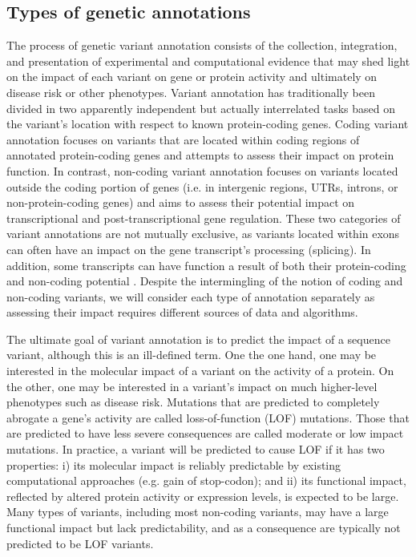 \subsection{Types of genetic annotations}

The process of genetic variant annotation consists of the collection, integration, and presentation of experimental and computational evidence that may shed light on the impact of each variant on gene or protein activity and ultimately on disease risk or other phenotypes. 
Variant annotation has traditionally been divided in two apparently independent but actually interrelated tasks based on the variant's location with respect to known protein-coding genes. 
Coding variant annotation focuses on variants that are located within coding regions of annotated protein-coding genes and attempts to assess their impact on protein function. 
In contrast, non-coding variant annotation focuses on variants located outside the coding portion of genes (i.e. in intergenic regions, UTRs, introns, or non-protein-coding genes) and aims to assess their potential impact on transcriptional and post-transcriptional gene regulation. 
These two categories of variant annotations are not mutually exclusive, as variants located within exons can often have an impact on the gene transcript's processing (splicing). 
In addition, some transcripts can have function  a result of both their protein-coding and non-coding potential \cite{alberts1995molecular}. 
Despite the intermingling of the notion of coding and non-coding variants, we will consider each type of annotation separately as assessing their impact requires different sources of data and algorithms.

The ultimate goal of variant annotation is to predict the impact of a sequence variant, although this is an ill-defined term. 
One the one hand, one may be interested in the molecular impact of a variant on the activity of a protein. 
On the other, one may be interested in a variant's impact on much higher-level phenotypes such as disease risk. 
Mutations that are predicted to completely abrogate a gene's activity are called loss-of-function (LOF) mutations. 
Those that are predicted to have less severe consequences are called moderate or low impact mutations. In practice, a variant will be predicted to cause LOF if it has two properties: 
i) its molecular impact is reliably predictable by existing computational approaches (e.g. gain of stop-codon); and 
ii) its functional impact, reflected by altered protein activity or expression levels, is expected to be large. 
Many types of variants, including most non-coding variants, may have a large functional impact but lack predictability, and as a consequence are typically not predicted to be LOF variants.

